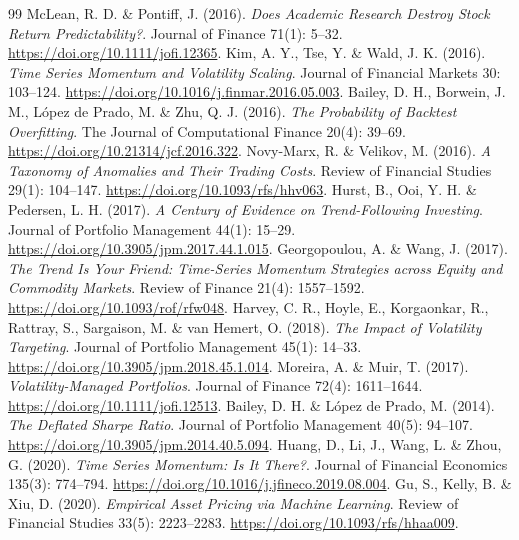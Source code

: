 \begin{thebibliography}{99}
 McLean, R. D. \& Pontiff, J. (2016). \emph{Does Academic Research Destroy Stock Return Predictability?}. Journal of Finance 71(1): 5--32. \href{https://doi.org/10.1111/jofi.12365}{https://doi.org/10.1111/jofi.12365}.
 Kim, A. Y., Tse, Y. \& Wald, J. K. (2016). \emph{Time Series Momentum and Volatility Scaling}. Journal of Financial Markets 30: 103--124. \href{https://doi.org/10.1016/j.finmar.2016.05.003}{https://doi.org/10.1016/j.finmar.2016.05.003}.
 Bailey, D. H., Borwein, J. M., López de Prado, M. \& Zhu, Q. J. (2016). \emph{The Probability of Backtest Overfitting}. The Journal of Computational Finance 20(4): 39--69. \href{https://doi.org/10.21314/jcf.2016.322}{https://doi.org/10.21314/jcf.2016.322}.
 Novy-Marx, R. \& Velikov, M. (2016). \emph{A Taxonomy of Anomalies and Their Trading Costs}. Review of Financial Studies 29(1): 104--147. \href{https://doi.org/10.1093/rfs/hhv063}{https://doi.org/10.1093/rfs/hhv063}.
 Hurst, B., Ooi, Y. H. \& Pedersen, L. H. (2017). \emph{A Century of Evidence on Trend-Following Investing}. Journal of Portfolio Management 44(1): 15--29. \href{https://doi.org/10.3905/jpm.2017.44.1.015}{https://doi.org/10.3905/jpm.2017.44.1.015}.
 Georgopoulou, A. \& Wang, J. (2017). \emph{The Trend Is Your Friend: Time-Series Momentum Strategies across Equity and Commodity Markets}. Review of Finance 21(4): 1557--1592. \href{https://doi.org/10.1093/rof/rfw048}{https://doi.org/10.1093/rof/rfw048}.
 Harvey, C. R., Hoyle, E., Korgaonkar, R., Rattray, S., Sargaison, M. \& van Hemert, O. (2018). \emph{The Impact of Volatility Targeting}. Journal of Portfolio Management 45(1): 14--33. \href{https://doi.org/10.3905/jpm.2018.45.1.014}{https://doi.org/10.3905/jpm.2018.45.1.014}.
 Moreira, A. \& Muir, T. (2017). \emph{Volatility-Managed Portfolios}. Journal of Finance 72(4): 1611--1644. \href{https://doi.org/10.1111/jofi.12513}{https://doi.org/10.1111/jofi.12513}.
 Bailey, D. H. \& López de Prado, M. (2014). \emph{The Deflated Sharpe Ratio}. Journal of Portfolio Management 40(5): 94--107. \href{https://doi.org/10.3905/jpm.2014.40.5.094}{https://doi.org/10.3905/jpm.2014.40.5.094}.
 Huang, D., Li, J., Wang, L. \& Zhou, G. (2020). \emph{Time Series Momentum: Is It There?}. Journal of Financial Economics 135(3): 774--794. \href{https://doi.org/10.1016/j.jfineco.2019.08.004}{https://doi.org/10.1016/j.jfineco.2019.08.004}.
 Gu, S., Kelly, B. \& Xiu, D. (2020). \emph{Empirical Asset Pricing via Machine Learning}. Review of Financial Studies 33(5): 2223--2283. \href{https://doi.org/10.1093/rfs/hhaa009}{https://doi.org/10.1093/rfs/hhaa009}.

\end{thebibliography}
